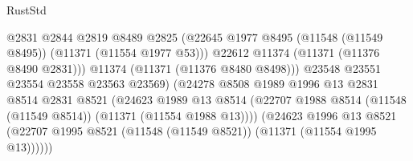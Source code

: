\begin{lexlean}{RustStd}
\begin{coremodule}
                                              @2831
                                              @2844
                                              @2819
                                              @8489
                                              @2825
                                              (@22645
                                                @1977
                                                @8495
                                                (@11548 (@11549 @8495))
                                                (@11371 (@11554 @1977 @53)))
                                              @22612
                                              @11374
                                              (@11371 (@11376 @8490 @2831)))
                                            @11374
                                            (@11371 (@11376 @8480 @8498)))
                                          @23548
                                          @23551
                                          @23554
                                          @23558
                                          @23563
                                          @23569)
                                        (@24278
                                          @8508
                                          @1989
                                          @1996
                                          @13
                                          @2831
                                          @8514
                                          @2831
                                          @8521
                                          (@24623
                                            @1989
                                            @13
                                            @8514
                                            (@22707
                                              @1988
                                              @8514
                                              (@11548 (@11549 @8514))
                                              (@11371 (@11554 @1988 @13))))
                                          (@24623
                                            @1996
                                            @13
                                            @8521
                                            (@22707
                                              @1995
                                              @8521
                                              (@11548 (@11549 @8521))
                                              (@11371 (@11554 @1995 @13))))))

\end{coremodule}
\end{lexlean}
